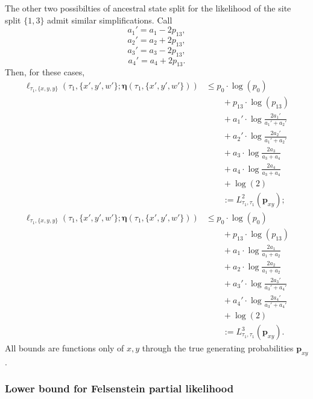 \documentclass[a4paper]{article}
\newcommand{\fullAncestralSplitPartitions}{\boldsymbol\eta}
\begin{document}
The other two possibilties of ancestral state split for the likelihood of the site split $\{1,3\}$ admit similar simplifications.
Call
$$
a_{1}' = a_{1}-2p_{13},
$$
$$
a_{2}' = a_{2}+2p_{13},
$$
$$
a_{3}' = a_{3}-2p_{13},
$$
$$
a_{4}' = a_{4}+2p_{13}.
$$
Then, for these cases,
\begin{align*}
    \ell_{\tau_1,\{x,y,y\}}(\tau_1, \{x',y',w'\}; \fullAncestralSplitPartitions(\tau_1,\{x',y',w'\}))
    &\le      p_{0}  \cdot\log(p_{0}) \\
    &\qquad + p_{13} \cdot\log(p_{13}) \\
    &\qquad + a_{1}'\cdot\log\frac{2a_{1}'}{a_{1}'+a_{2}'} \\
    &\qquad + a_{2}'\cdot\log\frac{2a_{2}'}{a_{1}'+a_{2}'} \\
    &\qquad + a_{3}\cdot\log\frac{2a_{3}}{a_{3}+a_{4}} \\
    &\qquad + a_{4}\cdot\log\frac{2a_{4}}{a_{3}+a_{4}} \\
    &\qquad + \log(2) \\
    &\qquad := L^{2}_{\tau_1,\tau_1}(\mathbf{p}_{xy});
\end{align*}
\begin{align*}
    \ell_{\tau_1,\{x,y,y\}}(\tau_1, \{x',y',w'\}; \fullAncestralSplitPartitions(\tau_1,\{x',y',w'\}))
    &\le      p_{0}  \cdot\log(p_{0}) \\
    &\qquad + p_{13} \cdot\log(p_{13}) \\
    &\qquad + a_{1}\cdot\log\frac{2a_{1}}{a_{1}+a_{2}} \\
    &\qquad + a_{2}\cdot\log\frac{2a_{2}}{a_{1}+a_{2}} \\
    &\qquad + a_{3}'\cdot\log\frac{2a_{3}'}{a_{3}'+a_{4}'} \\
    &\qquad + a_{4}'\cdot\log\frac{2a_{4}'}{a_{3}'+a_{4}'} \\
    &\qquad + \log(2) \\
    &\qquad := L^{3}_{\tau_1,\tau_1}(\mathbf{p}_{xy}).
\end{align*}
All bounds are functions only of $x,y$ through the true generating probabilities $\mathbf{p}_{xy}$.

\subsubsection{Lower bound for Felsenstein partial likelihood}
\end{document}
